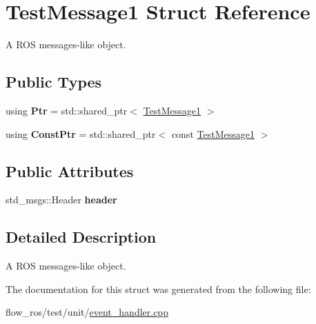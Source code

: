 \hypertarget{struct_test_message1}{}\section{Test\+Message1 Struct Reference}
\label{struct_test_message1}


A R\+OS messages-\/like object.  


\subsection*{Public Types}
\begin{DoxyCompactItemize}
\item 
\mbox{\label{struct_test_message1_afebf7176422a7ae4fd3c6e505dbd7fcb}} 
using {\bfseries Ptr} = std\+::shared\+\_\+ptr$<$ \hyperlink{struct_test_message1}{Test\+Message1} $>$
\item 
\mbox{\label{struct_test_message1_a12a11018fd576f645ecf2abfff986453}} 
using {\bfseries Const\+Ptr} = std\+::shared\+\_\+ptr$<$ const \hyperlink{struct_test_message1}{Test\+Message1} $>$
\end{DoxyCompactItemize}
\subsection*{Public Attributes}
\begin{DoxyCompactItemize}
\item 
\mbox{\label{struct_test_message1_a77d94be075633cc256e0502cfdd479ca}} 
std\+\_\+msgs\+::\+Header {\bfseries header}
\end{DoxyCompactItemize}


\subsection{Detailed Description}
A R\+OS messages-\/like object. 

The documentation for this struct was generated from the following file\+:\begin{DoxyCompactItemize}
\item 
flow\+\_\+ros/test/unit/\hyperlink{event__handler_8cpp}{event\+\_\+handler.\+cpp}\end{DoxyCompactItemize}

